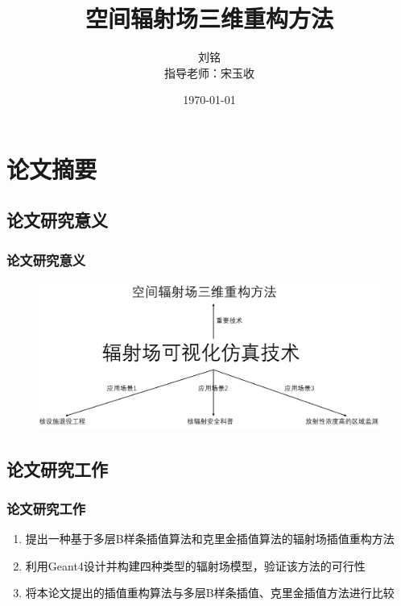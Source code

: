 \documentclass{beamer}
\title{空间辐射场三维重构方法}
\author[刘铭]{%
    刘铭 \\
    指导老师：宋玉收%
}
\institute{哈尔滨工程大学核科学与技术学院}
\date{%
\today}
\begin{document}
\begin{frame}
    \maketitle
\end{frame}

\begin{frame}
    \tableofcontents
\end{frame}

\section{论文摘要}

\subsection{论文研究意义}
\begin{frame}
    \frametitle{论文研究意义}

    \begin{figure}
        \centering
        \includegraphics[width=1.0\textwidth]{figures/研究意义.pdf}
    \end{figure}

\end{frame}

\subsection{论文研究工作}
\begin{frame}
    \frametitle{论文研究工作}
    \begin{enumerate}
        \item 提出一种基于多层B样条插值算法和克里金插值算法的辐射场插值重构方法
        \item 利用Geant4设计并构建四种类型的辐射场模型，验证该方法的可行性
        \item 将本论文提出的插值重构算法与多层B样条插值、克里金插值方法进行比较
    \end{enumerate}
\end{frame}
\end{document}
